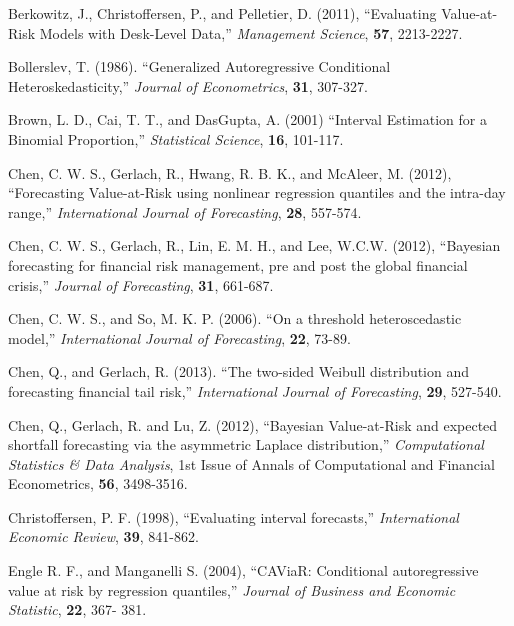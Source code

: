 \documentclass[12pt,epsf]{article}
\begin{document}
\begin{description}
\item
Berkowitz, J., Christoffersen, P., and Pelletier, D. (2011), ``Evaluating Value-at-Risk Models with Desk-Level Data,''
{\em Management Science}, {\bf 57}, 2213-2227.

\item Bollerslev, T. (1986). ``Generalized Autoregressive Conditional Heteroskedasticity,'' {\em Journal of Econometrics},
{\bf 31}, 307-327.

\item Brown, L. D., Cai, T. T., and DasGupta, A. (2001) ``Interval Estimation for a Binomial Proportion,''
{\em Statistical Science}, {\bf 16}, 101-117.

\item Chen, C. W. S., Gerlach, R., Hwang, R. B. K., and McAleer, M. (2012), ``Forecasting Value-at-Risk
using nonlinear regression quantiles and the intra-day range,'' {\em International Journal of Forecasting}, {\bf 28}, 557-574.

\item
Chen, C. W. S., Gerlach, R., Lin, E. M. H., and Lee, W.C.W. (2012), ``Bayesian forecasting for financial risk management, pre and post the
global financial crisis,'' {\em Journal of Forecasting}, {\bf 31}, 661-687.

\item
Chen, C. W. S., and  So, M. K. P. (2006). ``On a threshold heteroscedastic model,'' {\em International Journal of Forecasting}, {\bf 22},
73-89.

\item
Chen, Q., and Gerlach, R. (2013). ``The two-sided Weibull distribution and forecasting financial tail risk,''
{\em International Journal of Forecasting}, {\bf 29}, 527-540.

\item
Chen, Q., Gerlach, R. and Lu, Z. (2012), ``Bayesian Value-at-Risk and expected shortfall forecasting via the asymmetric
Laplace distribution,'' {\em Computational Statistics \& Data Analysis}, 1st Issue of Annals of Computational and Financial
Econometrics, {\bf 56}, 3498-3516.

\item Christoffersen, P. F. (1998), ``Evaluating interval forecasts,'' {\em International Economic Review}, {\bf39}, 841-862.

\item Engle R. F., and Manganelli S. (2004), ``CAViaR: Conditional autoregressive value at risk by regression quantiles,''
{\em Journal of Business and Economic Statistic}, {\bf 22}, 367- 381.


\end{description}
\end{document}
